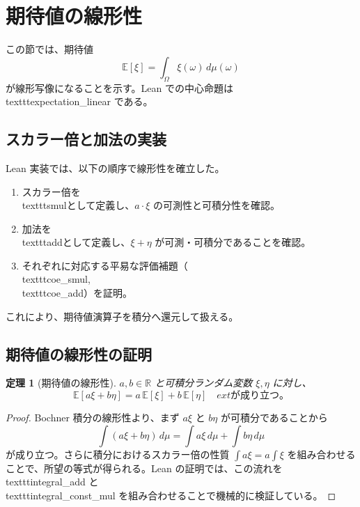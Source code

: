 \documentclass[12pt]{ltjsarticle}
\theoremstyle{definition}
\theoremstyle{plain}
\newtheorem{theorem}[definition]{定理}
\begin{document}
\section{期待値の線形性}
この節では、期待値
\[
  \mathbb{E}[\xi] = \int_{\Omega} \xi(\omega)\, d\mu(\omega)
\]
が線形写像になることを示す。Lean での中心命題は\\texttt{expectation\_linear} である。

\subsection{スカラー倍と加法の実装}
Lean 実装では、以下の順序で線形性を確立した。
\begin{enumerate}[label=\textup{(\alph*)}]
  \item スカラー倍を\\texttt{smul}として定義し、$a \cdot \xi$ の可測性と可積分性を確認。
  \item 加法を\\texttt{add}として定義し、$\xi+\eta$ が可測・可積分であることを確認。
  \item それぞれに対応する平易な評価補題（\\texttt{coe\_smul}, \\texttt{coe\_add}）を証明。
\end{enumerate}
これにより、期待値演算子を積分へ還元して扱える。

\subsection{期待値の線形性の証明}
\begin{theorem}[期待値の線形性]
$a,b \in \mathbb{R}$ と可積分ランダム変数 $\xi,\eta$ に対し、
\[
  \mathbb{E}[a\xi + b\eta] = a\,\mathbb{E}[\xi] + b\,\mathbb{E}[\eta]\quad
	ext{が成り立つ。}
\]
\end{theorem}
\begin{proof}
Bochner 積分の線形性より、まず $a\xi$ と $b\eta$ が可積分であることから
\[
  \int (a \xi + b \eta) \, d\mu = \int a\xi \, d\mu + \int b\eta \, d\mu
\]
が成り立つ。さらに積分におけるスカラー倍の性質 $\int a\xi = a \int \xi$ を組み合わせることで、所望の等式が得られる。Lean の証明では、この流れを\\texttt{integral\_add} と\\texttt{integral\_const\_mul} を組み合わせることで機械的に検証している。
\end{proof}
\end{document}

